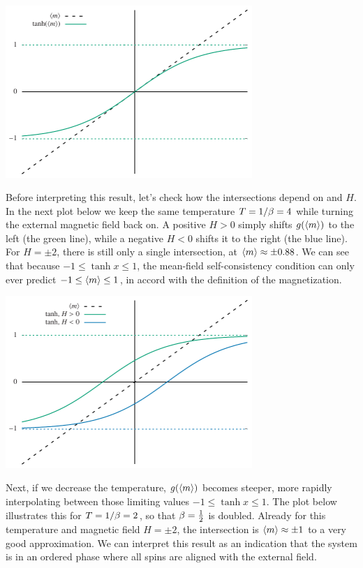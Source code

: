 \begin{center}\includegraphics[width=0.7\textwidth]{figs/week10_consistency.pdf}\end{center}

Before interpreting this result, let's check how the intersections depend on \be and $H$.
In the next plot below we keep the same temperature $T = 1 / \beta = 4$ while turning the external magnetic field back on.
A positive $H > 0$ simply shifts $g(\left\langle m \right\rangle)$ to the left (the green line), while a negative $H < 0$ shifts it to the right (the blue line).
For $H = \pm 2$, there is still only a single intersection, at $\left\langle m \right\rangle \approx \pm 0.88$.
We can see that because $-1 \leq \tanh x \leq 1$, the mean-field self-consistency condition can only ever predict $-1 \leq \left\langle m \right\rangle \leq 1$, in accord with the definition of the magnetization.

\begin{center}\includegraphics[width=0.7\textwidth]{figs/week10_consistency_H.pdf}\end{center}

Next, if we decrease the temperature, $g(\left\langle m \right\rangle)$ becomes steeper, more rapidly interpolating between those limiting values $-1 \leq \tanh x \leq 1$.
The plot below illustrates this for $T = 1 / \beta = 2$, so that $\beta = \frac{1}{2}$ is doubled.
Already for this temperature and magnetic field $H = \pm 2$, the intersection is $\left\langle m \right\rangle \approx \pm 1$ to a very good approximation.
We can interpret this result as an indication that the system is in an ordered phase where all spins are aligned with the external field.

